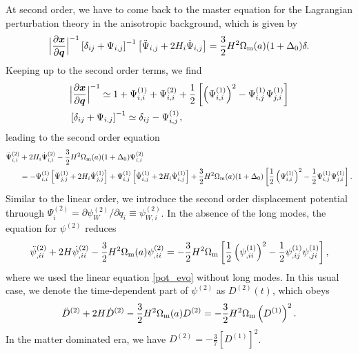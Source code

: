\documentclass[a4paper,11pt]{article}
\newcommand{\vx}{{\bm x}}
\newcommand{\vq}{{\bm q}}
\begin{document}
At second order, we have to come back to the master equation for the Lagrangian perturbation theory
in the anisotropic background, which is given by
\begin{align}
    \Bigl| \frac{\partial\vx}{\partial\vq} \Bigr|^{-1} 
    \left[ \delta_{ij} + \Psi_{i,j} \right]^{-1}
    \left[ \ddot{\Psi}_{i,j} + 2H_i\dot{\Psi}_{i,j} \right]
    =\frac32 H^2\Omega_{\rm m}(a)(1+\Delta_0)\delta.
\end{align}
Keeping up to the second order terms, we find 
\begin{align}
&\Bigl| \frac{\partial\vx}{\partial\vq} \Bigr|^{-1}  \simeq 
    1 + \Psi_{i,i}^{(1)} + \Psi_{i,i}^{(2)} + \frac12 \left[\left(\Psi_{i,i}^{(1)} \right)^2 - \Psi_{i,j}^{(1)}\Psi_{j,i}^{(1)} \right]
    \\
&\left[ \delta_{ij} + \Psi_{i,j} \right]^{-1} \simeq \delta_{ij} - \Psi_{i,j}^{(1)},
\end{align}
leading to the second order equation
\begin{align}
\ddot \Psi^{(2)}_{i,i} &+ 2H_i\dot \Psi^{(2)}_{i,i} -\frac32 H^2\Omega_{\rm m}(a)(1+\Delta_0)\Psi_{i,i}^{(2)}
    \nonumber\\
    &= -\Psi_{i,i}^{(1)}\left[\ddot \Psi^{(1)}_{j,j} + 2H_i\dot \Psi_{j,j}^{(1)} \right]
    + \Psi_{i,j}^{(1)}\left[\ddot \Psi^{(1)}_{i,j} + 2H_i\dot \Psi_{i,j}^{(1)} \right]
    + \frac32 H^2 \Omega_{\rm m}(a) (1+\Delta_0) 
    \left[\frac12\left(\Psi_{i,i}^{(1)}\right)^2 - \frac12\Psi_{i,j}^{(1)}\Psi_{j,i}^{(1)}  \right].
\end{align}
Similar to the linear order, we introduce the second order displacement potential
thruough $\Psi_i^{(2)} = \partial\psi_W^{(2)}/\partial q_i \equiv \psi^{(2)}_{W,i}$. 
In the absence of the long modes, the equation for $\psi^{(2)}$ reduces
\begin{align}
\ddot \psi^{(2)}_{,ii} + 2H\dot \psi^{(2)}_{,ii}-\frac32 H^2 \Omega_{\rm m}(a)\psi^{(2)}_{,ii}
 = -\frac32 H^2 \Omega_{\rm m}\left[\frac12 \left( \psi^{(1)}_{,ii} \right)^2 -\frac12 \psi^{(1)}_{,ij}\psi^{(1)}_{,ji} \right],
\end{align}
where we used the linear equation \eqref{pot_evo} without long modes.
In this usual case, we denote the time-dependent part of $\psi^{(2)}$ as $D^{(2)}(t)$, which obeys
\begin{align}
\ddot D^{(2)} + 2H \dot D^{(2)} - \frac32 H^2 \Omega_{\rm m}(a) D^{(2)} = -\frac32 H^2 \Omega_{\rm m}\left( D^{(1)} \right)^2.
\end{align}
In the matter dominated era, we have $D^{(2)}= -\frac37 \left[D^{(1)}\right]^2$.
\end{document}
